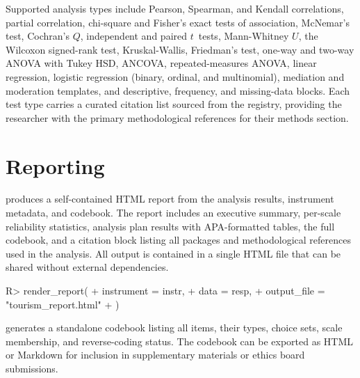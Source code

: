 \documentclass[article]{jss}\usepackage[]{graphicx}\usepackage[]{xcolor}
\begin{document}
Supported analysis types include Pearson, Spearman, and Kendall
correlations, partial correlation, chi-square and Fisher's exact tests
of association, McNemar's test, Cochran's $Q$, independent and paired
$t$~tests, Mann-Whitney $U$, the Wilcoxon signed-rank test,
Kruskal-Wallis, Friedman's test, one-way and two-way ANOVA with Tukey
HSD, ANCOVA, repeated-measures ANOVA, linear regression, logistic
regression (binary, ordinal, and multinomial), mediation and moderation
templates, and descriptive, frequency, and missing-data blocks. Each
test type carries a curated citation list sourced from
the  registry, providing the researcher with
the primary methodological references for their methods section.

\section{Reporting}
\label{sec:reporting}

 produces a self-contained HTML report
from the analysis results, instrument metadata, and codebook. The
report includes an executive summary, per-scale reliability statistics,
analysis plan results with APA-formatted tables, the full codebook,
and a citation block listing all packages and methodological references
used in the analysis. All output is contained in a single HTML file
that can be shared without external dependencies.

\begin{Code}
R> render_report(
+    instrument  = instr,
+    data        = resp,
+    output_file = "tourism_report.html"
+  )
\end{Code}

 generates a standalone codebook listing all
items, their types, choice sets, scale membership, and reverse-coding
status. The codebook can be exported as HTML or Markdown for inclusion
in supplementary materials or ethics board submissions.
\end{document}

